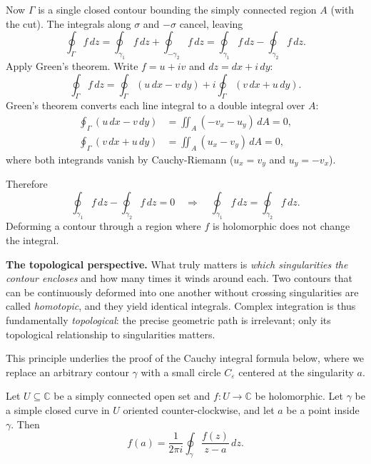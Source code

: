 \begin{remark}
  Now $\Gamma$ is a single closed contour bounding the simply connected region $A$ (with the cut).
  The integrals along $\sigma$ and $-\sigma$ cancel, leaving
  \[
    \oint_\Gamma f \, dz = \oint_{\gamma_1} f \, dz + \oint_{-\gamma_2} f \, dz = \oint_{\gamma_1} f \, dz - \oint_{\gamma_2} f \, dz.
  \]
  Apply Green's theorem.
  Write $f = u + iv$ and $dz = dx + i\,dy$:
  \[
    \oint_\Gamma f \, dz = \oint_\Gamma (u \, dx - v \, dy) + i \oint_\Gamma (v \, dx + u \, dy).
  \]
  Green's theorem converts each line integral to a double integral over $A$:
  \begin{align*}
    \oint_\Gamma (u \, dx - v \, dy) & = \iint_A (-v_x - u_y) \, dA = 0, \\
    \oint_\Gamma (v \, dx + u \, dy) & = \iint_A (u_x - v_y) \, dA = 0,
  \end{align*}
  where both integrands vanish by Cauchy-Riemann ($u_x = v_y$ and $u_y = -v_x$).

  Therefore
  \[
    \oint_{\gamma_1} f \, dz - \oint_{\gamma_2} f \, dz = 0 \quad \Longrightarrow \quad \oint_{\gamma_1} f \, dz = \oint_{\gamma_2} f \, dz.
  \]
  Deforming a contour through a region where $f$ is holomorphic does not change the integral.

  \textbf{The topological perspective.}
  What truly matters is \emph{which singularities the contour encloses} and how many times it winds around each.
  Two contours that can be continuously deformed into one another without crossing singularities are called \emph{homotopic}, and they yield identical integrals.
  Complex integration is thus fundamentally \emph{topological}: the precise geometric path is irrelevant; only its topological relationship to singularities matters.

  This principle underlies the proof of the Cauchy integral formula below, where we replace an arbitrary contour $\gamma$ with a small circle $C_\varepsilon$ centered at the singularity $a$.
\end{remark}

\begin{theorem}
  Let $U \subseteq \mathbb{C}$ be a simply connected open set and $f : U \to \mathbb{C}$ be holomorphic.
  Let $\gamma$ be a simple closed curve in $U$ oriented counter-clockwise, and let $a$ be a point inside $\gamma$. Then
  \begin{equation}
    f(a) = \frac{1}{2\pi i} \oint_{\gamma} \frac{f(z)}{z - a} \, dz.
  \end{equation}
\end{theorem}

